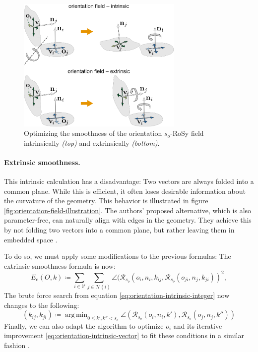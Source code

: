 \documentclass{ACGSeminar}
\DeclareMathOperator*{\argmin}{arg\,min}
\begin{document}
\begin{figure}[htb!]
	\begin{centering}
		\includegraphics[width=8cm]{img/orientation-field-intrinsic-extrinsic.png}\par
	\end{centering}
	\caption{Optimizing the smoothness of the orientation $s_o$-RoSy field intrinsically \textit{(top)} and extrinsically \textit{(bottom)}. \cite{jakob2015instant}}
	\label{fig:orientation-field-intrinsic-extrinsic}
\end{figure}

\paragraph{Extrinsic smoothness.}
This intrinsic calculation has a disadvantage: Two vectors are always folded into a common plane. While this is efficient, it often loses desirable information about the curvature of the geometry. This behavior is illustrated in figure \ref{fig:orientation-field-illustration}. The authors' proposed alternative, which is also parameter-free, can naturally align with edges in the geometry. They achieve this by not folding two vectors into a common plane, but rather leaving them in embedded space \cite{jakob2015instant}.\bigskip

To do so, we must apply some modifications to the previous formulas:
The extrinsic smoothness formula is now:
\begin{equation}\label{eq:orientation-extrinsic-energy}
	E_e(O,k) \coloneqq \sum_{i \in \mathcal{V}} \sum_{j \in \mathcal{N}(i)} \angle(\mathcal{R}_{s_o}(o_{i}, n_i, k_{ij}, \mathcal{R}_{s_o}(o_{ji}, n_j, k_{ji}))^2,
\end{equation}
The brute force search from equation \eqref{eq:orientation-intrinsic-integer} now changes to the following:
\begin{equation}\label{eq:orientation-extrinsic-integer}
	(k_{ij}, k_{ji}) \coloneqq \argmin_{0 \leq k',k'' < s_o} \angle(\mathcal{R}_{s_o}(o_i, n_i, k'), \mathcal{R}_{s_o}(o_j, n_j, k''))
\end{equation}
Finally, we can also adapt the algorithm to optimize $o_i$ and its iterative improvement \eqref{eq:orientation-intrinsic-vector} to fit these conditions in a similar fashion \cite{jakob2015instant}.
\end{document}
